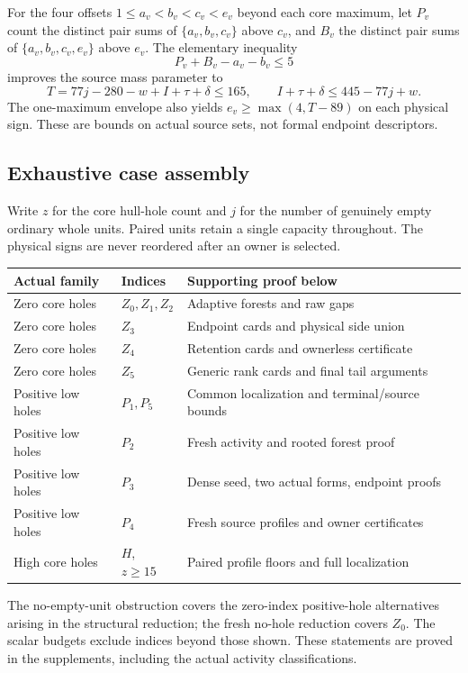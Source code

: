 \documentclass[10pt,a4paper]{article}
\theoremstyle{definition}
\begin{document}
For the four offsets $1\le a_v<b_v<c_v<e_v$ beyond each core maximum, let
$P_v$ count the distinct pair sums of $\{a_v,b_v,c_v\}$ above $c_v$, and
$B_v$ the distinct pair sums of $\{a_v,b_v,c_v,e_v\}$ above $e_v$. The
elementary inequality
\[
 P_v+B_v-a_v-b_v\le5
\]
improves the source mass parameter to
\[
 T=77j-280-w+I+\tau+\delta\le165,
 \qquad I+\tau+\delta\le445-77j+w.
\]
The one-maximum envelope also yields $e_v\ge\max(4,T-89)$ on each physical
sign. These are bounds on actual source sets, not formal endpoint descriptors.

\subsection{Exhaustive case assembly}
Write $z$ for the core hull-hole count and $j$ for the number of genuinely empty
ordinary whole units. Paired units retain a single capacity throughout. The
physical signs are never reordered after an owner is selected.

\begin{center}
\begin{tabular}{lll}
\toprule
Actual family & Indices & Supporting proof below\\
\midrule
Zero core holes & $Z_0,Z_1,Z_2$ & Adaptive forests and raw gaps\\
Zero core holes & $Z_3$ & Endpoint cards and physical side union\\
Zero core holes & $Z_4$ & Retention cards and ownerless certificate\\
Zero core holes & $Z_5$ & Generic rank cards and final tail arguments\\
Positive low holes & $P_1,P_5$ & Common localization and terminal/source bounds\\
Positive low holes & $P_2$ & Fresh activity and rooted forest proof\\
Positive low holes & $P_3$ & Dense seed, two actual forms, endpoint proofs\\
Positive low holes & $P_4$ & Fresh source profiles and owner certificates\\
High core holes & $H$, $z\ge15$ & Paired profile floors and full localization\\
\bottomrule
\end{tabular}
\end{center}
The no-empty-unit obstruction covers the zero-index positive-hole alternatives
arising in the structural reduction; the fresh no-hole reduction covers $Z_0$.
The scalar budgets exclude indices beyond those shown. These statements are
proved in the supplements, including the actual activity classifications.
\end{document}

